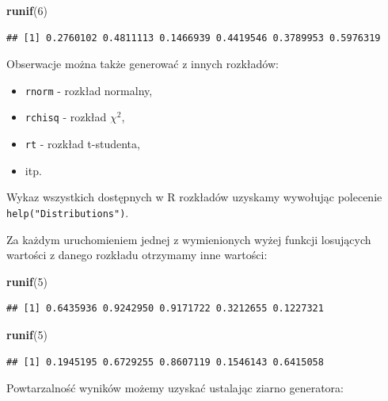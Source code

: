 \documentclass[]{book}
\newenvironment{Shaded}{\begin{snugshade}}{\end{snugshade}}
\newcommand{\KeywordTok}[1]{\textcolor[rgb]{0.13,0.29,0.53}{\textbf{#1}}}
\newcommand{\DecValTok}[1]{\textcolor[rgb]{0.00,0.00,0.81}{#1}}
\newcommand{\NormalTok}[1]{#1}
\providecommand{\tightlist}{%
  \setlength{\itemsep}{0pt}\setlength{\parskip}{0pt}}
\begin{document}
\begin{Shaded}
\begin{Highlighting}[]
\KeywordTok{runif}\NormalTok{(}\DecValTok{6}\NormalTok{)}
\end{Highlighting}
\end{Shaded}

\begin{verbatim}
## [1] 0.2760102 0.4811113 0.1466939 0.4419546 0.3789953 0.5976319
\end{verbatim}

Obserwacje można także generować z innych rozkładów:

\begin{itemize}
\tightlist
\item
  \texttt{rnorm} - rozkład normalny,
\item
  \texttt{rchisq} - rozkład \(\chi^2\),
\item
  \texttt{rt} - rozkład t-studenta,
\item
  itp.
\end{itemize}

Wykaz wszystkich dostępnych w R rozkładów uzyskamy wywołując polecenie
\texttt{help("Distributions")}.

Za każdym uruchomieniem jednej z wymienionych wyżej funkcji losujących
wartości z danego rozkładu otrzymamy inne wartości:

\begin{Shaded}
\begin{Highlighting}[]
\KeywordTok{runif}\NormalTok{(}\DecValTok{5}\NormalTok{)}
\end{Highlighting}
\end{Shaded}

\begin{verbatim}
## [1] 0.6435936 0.9242950 0.9171722 0.3212655 0.1227321
\end{verbatim}

\begin{Shaded}
\begin{Highlighting}[]
\KeywordTok{runif}\NormalTok{(}\DecValTok{5}\NormalTok{)}
\end{Highlighting}
\end{Shaded}

\begin{verbatim}
## [1] 0.1945195 0.6729255 0.8607119 0.1546143 0.6415058
\end{verbatim}

Powtarzalność wyników możemy uzyskać ustalając ziarno generatora:
\end{document}
